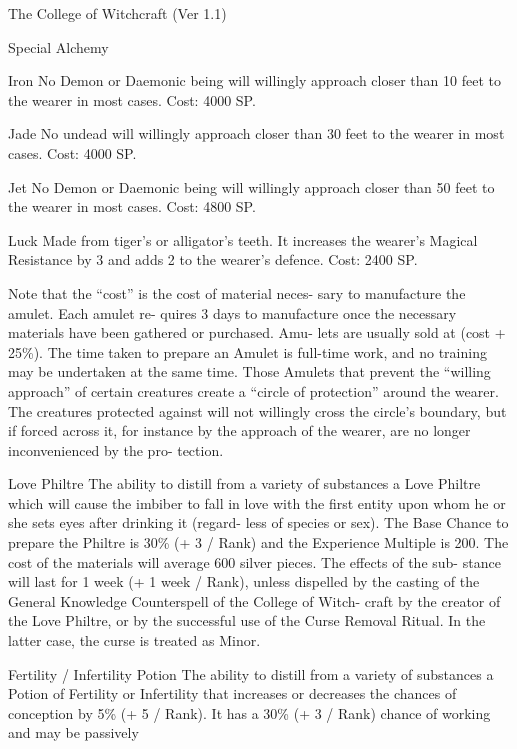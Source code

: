 \begin{Chapter}{The College of Witchcraft (Ver 1.1)}
\begin{talent}[T-2]{Special Alchemy }
\begin{effects}
Iron  No  Demon  or  Daemonic  being will  willingly 
approach closer than 10 feet to the wearer in most 
cases. Cost: 4000 SP. 

Jade  No  undead  will  willingly  approach  closer 
than 30 feet to the wearer in most cases. Cost: 4000 
SP. 

Jet  No  Demon  or  Daemonic  being  will  willingly 
approach closer than 50 feet to the wearer in most 
cases. Cost: 4800 SP. 

Luck  Made  from  tiger’s  or  alligator’s  teeth.  It 
increases the wearer’s Magical Resistance by 3 and 
adds 2 to the wearer’s defence. Cost: 2400 SP. 

Note  that  the  “cost”  is  the  cost  of  material  neces-
sary  to  manufacture  the  amulet.  Each  amulet  re-
quires  3  days  to  manufacture  once  the  necessary 
materials  have  been  gathered  or  purchased.  Amu-
lets  are  usually  sold  at  (cost  +  25\%).  The  time 
taken  to  prepare  an  Amulet  is  full-time  work,  and 
no  training  may  be  undertaken  at  the  same  time. 
Those Amulets that prevent the “willing approach” 
of  certain  creatures  create  a  “circle  of  protection” 
around the wearer. The creatures protected against 
will not willingly cross the circle’s boundary, but if 
forced across it, for instance by the approach of the 
wearer,  are  no  longer  inconvenienced  by  the  pro-
tection. 

Love Philtre The ability to distill from a variety of 
substances  a  Love  Philtre  which  will  cause  the 
imbiber  to  fall  in  love  with  the  first  entity  upon 
whom he or she sets eyes after drinking it (regard-
less of species or sex). The Base Chance to prepare 
the Philtre is 30\% (+ 3 / Rank) and the Experience 
Multiple  is  200.  The  cost  of  the  materials  will 
average  600  silver  pieces.  The  effects  of  the  sub-
stance  will  last  for  1  week  (+  1  week  /  Rank), 
unless  dispelled  by  the  casting  of  the  General 
Knowledge  Counterspell  of  the  College  of  Witch-
craft  by  the  creator  of  the  Love  Philtre,  or  by  the 
successful use of the Curse Removal Ritual. In the 
latter case, the curse is treated as Minor. 

Fertility  /  Infertility  Potion  The  ability  to  distill 
from a variety of substances a Potion of Fertility or 
Infertility that increases or decreases the chances of 
conception by 5\% (+ 5 / Rank). It has a 30\% (+ 3 / 
Rank)  chance  of  working  and  may  be  passively 


\end{effects}
\end{talent}
\end{Chapter}
